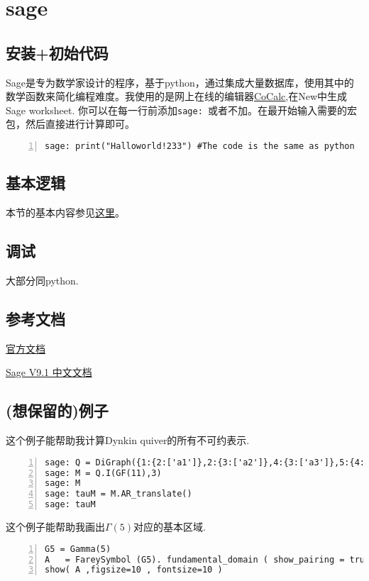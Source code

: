 \documentclass[11pt]{amsart}
\begin{document}
\begin{lstlisting}[language=iPython]
\end{lstlisting}
\section{sage}
\subsection{安装+初始代码}
Sage是专为数学家设计的程序，基于python，通过集成大量数据库，使用其中的数学函数来简化编程难度。我使用的是网上在线的编辑器\href{https://cocalc.com/projects}{CoCalc},在New中生成Sage worksheet.
你可以在每一行前添加\lstinline|sage: |或者不加。在最开始输入需要的宏包，然后直接进行计算即可。

\begin{lstlisting}[numbers=left,numberstyle=\tiny,numbersep=10pt]
sage: print("Halloworld!233") #The code is the same as python
\end{lstlisting}
\subsection{基本逻辑}
本节的基本内容参见\href{https://www.osgeo.cn/sagemath/thematic_tutorials/tutorial-programming-python.html#tutorial-programming-python}{这里}。
\subsection{调试}
大部分同python.

\subsection{参考文档}
\href{https://doc.sagemath.org/}{官方文档}

\href{https://www.osgeo.cn/sagemath/index.html}{Sage V9.1 中文文档}
\subsection{(想保留的)例子}

这个例子能帮助我计算Dynkin quiver的所有不可约表示.
\begin{lstlisting}[numbers=left,numberstyle=\tiny,numbersep=10pt]
sage: Q = DiGraph({1:{2:['a1']},2:{3:['a2']},4:{3:['a3']},5:{4:['a4']},6:{3:['a5']}}).path_semigroup()
sage: M = Q.I(GF(11),3)
sage: M
sage: tauM = M.AR_translate()
sage: tauM
\end{lstlisting}

这个例子能帮助我画出$\Gamma(5)$对应的基本区域.
\begin{lstlisting}[numbers=left,numberstyle=\tiny,numbersep=10pt]
G5 = Gamma(5)
A   = FareySymbol (G5). fundamental_domain ( show_pairing = true )
show( A ,figsize=10 , fontsize=10 )
\end{lstlisting}
\end{document}
